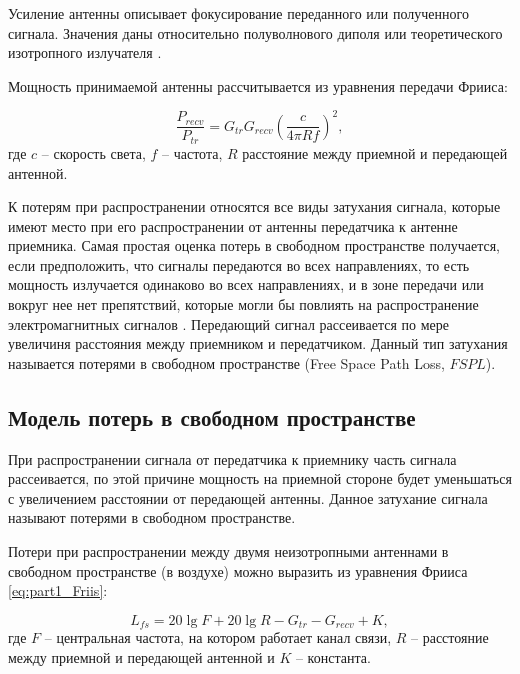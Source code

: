 Усиление антенны описывает фокусирование переданного или полученного сигнала. Значения даны относительно полуволнового диполя или теоретического изотропного излучателя \cite{Gost62657}.

Мощность принимаемой антенны рассчитывается из уравнения передачи Фрииса:

\begin{equation}
  \label{eq:part1_Friis}
  \frac{P_{recv}}{P_{tr}} = G_{tr}G_{recv}\left(\frac{c}{4\pi R f} \right)^2,
\end{equation}
где
$c$ --  скорость света,
$f$ -- частота, 
$R$ расстояние между приемной и передающей антенной.


К потерям при распространении относятся все виды затухания сигнала, которые имеют место при его распространении от антенны передатчика к антенне приемника. Самая простая оценка потерь в свободном пространстве получается, если предположить, что сигналы передаются во всех направлениях, то есть мощность излучается одинаково во всех направлениях, и в зоне передачи или вокруг нее нет препятствий, которые могли бы повлиять на распространение электромагнитных сигналов \cite{Krouk2010}. Передающий сигнал рассеивается по мере увеличиня расстояния между приемником и передатчиком. Данный тип затухания называется потерями в свободном пространстве (Free Space Path Loss, $FSPL$).

\subsection{Модель потерь в свободном пространстве}
При распространении сигнала от передатчика к приемнику часть сигнала рассеивается, по этой причине мощность на приемной стороне будет уменьшаться с увеличением  расстоянии от передающей антенны. Данное затухание сигнала называют потерями в свободном пространстве.

Потери при распространении между двумя неизотропными антеннами в свободном пространстве (в воздухе) можно выразить из уравнения Фрииса \cref{eq:part1_Friis}:



\begin{equation}
  \label{eq:part3_L_fs}
  L_{fs} = 20 \lg{F} + 20\lg{R} - G_{tr} - G_{recv} + K,
  \end{equation}
где $F$ -- центральная частота, на котором работает канал связи, $R$ -- расстояние между приемной и передающей антенной и $K$ -- константа.

